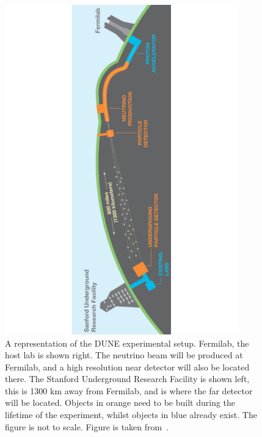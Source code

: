 \begin{figure}[h!]
  \centering
  \includegraphics[width=0.9\textwidth]{DUNESchematic}
  \caption[A representation of the DUNE experimental setup]
          {A representation of the DUNE experimental setup. Fermilab, the host lab is shown right. The neutrino beam will be produced at Fermilab, and a high resolution near detector will also be located there. The Stanford Underground Research Facility is shown left, this is 1300 km away from Fermilab, and is where the far detector will be located. Objects in orange need to be built during the lifetime of the experiment, whilst objects in blue already exist. The figure is not to scale. Figure is taken from~\citep{DUNECDR_V1}.}
  \label{fig:DUNESchematic}
\end{figure}

